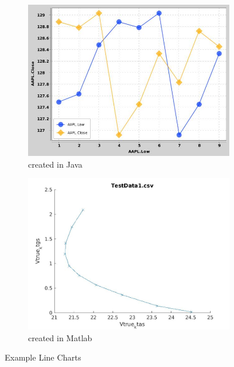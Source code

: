 \documentclass[12pt, a4paper,oneside]{report}
\begin{document}
\begin{figure}
	\begin{subfigure}{.5\textwidth}
		\centering
		\includegraphics[width=.8\linewidth]{line1}
		\caption{created in Java}
		\label{fig:sfig1}
	\end{subfigure}%
	\begin{subfigure}{.5\textwidth}
		\centering
		\includegraphics[width=.8\linewidth]{line2}
		\caption{created in Matlab}
		\label{fig:sfig2}
	\end{subfigure}
	\caption{Example Line Charts}
	\label{fig:fig}
\end{figure}
\end{document}
